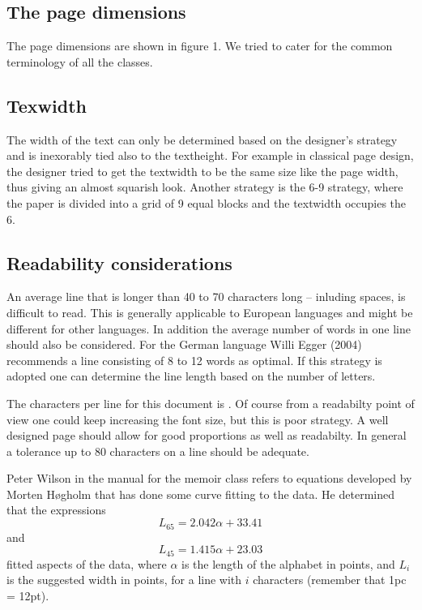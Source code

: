 \subsection{The page dimensions}

The page dimensions are shown in figure 1. We tried to cater for the common terminology of all the classes.

\subsection{Texwidth}

The width of the text can only be determined based on the designer's strategy and is inexorably tied also to
the textheight. For example in classical page design, the designer tried to get the textwidth to be the same size like the page width, thus giving an almost squarish look. Another strategy is the 6-9 strategy, where the paper is divided into a grid of 9 equal blocks and the textwidth occupies the 6. 

\subsection{Readability considerations}

An average line that is longer than 40 to 70 characters long -- inluding spaces, is difficult to read. This is generally applicable to European languages and might be different for other languages. In addition the average number of words in one line should also be considered. For the German language Willi Egger (2004) recommends a line consisting of 8 to 12 words as optimal. If this strategy is adopted one can determine the line length based on the number of letters.

The characters per line for this document is \charactersperline. Of course from a readabilty point of view one could keep increasing the font size, but this is poor strategy. A well designed page should allow for good proportions as well as readabilty. In general a tolerance up  to 80 characters on a line should be adequate.

Peter Wilson in the manual for the memoir class refers to equations developed by Morten H{\o}gholm that has done some curve fitting
to the data. He determined that the expressions
\begin{equation}
L_{65} = 2.042\alpha + 33.41 \label{eq:L65}
\end{equation}
and
\begin{equation}
L_{45} = 1.415\alpha + 23.03 \label{eq:L45}
\end{equation}
fitted aspects of the data, where $\alpha$ is the length of the alphabet
in points, and $L_{i}$ is the suggested width in points, for a line with
$i$ characters (remember that 1pc = 12pt).

